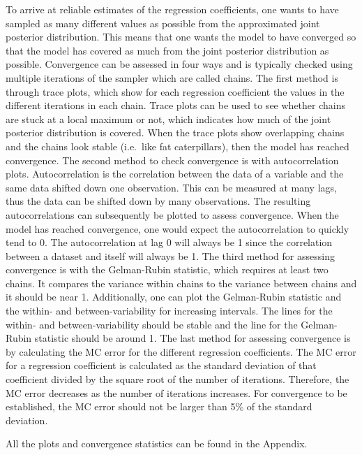 \documentclass[
]{article}
\begin{document}
To arrive at reliable estimates of the regression coefficients, one
wants to have sampled as many different values as possible from the
approximated joint posterior distribution. This means that one wants the
model to have converged so that the model has covered as much from the
joint posterior distribution as possible. Convergence can be assessed in
four ways and is typically checked using multiple iterations of the
sampler which are called chains. The first method is through trace
plots, which show for each regression coefficient the values in the
different iterations in each chain. Trace plots can be used to see
whether chains are stuck at a local maximum or not, which indicates how
much of the joint posterior distribution is covered. When the trace
plots show overlapping chains and the chains look stable (i.e.~like fat
caterpillars), then the model has reached convergence. The second method
to check convergence is with autocorrelation plots. Autocorrelation is
the correlation between the data of a variable and the same data shifted
down one observation. This can be measured at many lags, thus the data
can be shifted down by many observations. The resulting autocorrelations
can subsequently be plotted to assess convergence. When the model has
reached convergence, one would expect the autocorrelation to quickly
tend to 0. The autocorrelation at lag 0 will always be 1 since the
correlation between a dataset and itself will always be 1. The third
method for assessing convergence is with the Gelman-Rubin statistic,
which requires at least two chains. It compares the variance within
chains to the variance between chains and it should be near 1.
Additionally, one can plot the Gelman-Rubin statistic and the within-
and between-variability for increasing intervals. The lines for the
within- and between-variability should be stable and the line for the
Gelman-Rubin statistic should be around 1. The last method for assessing
convergence is by calculating the MC error for the different regression
coefficients. The MC error for a regression coefficient is calculated as
the standard deviation of that coefficient divided by the square root of
the number of iterations. Therefore, the MC error decreases as the
number of iterations increases. For convergence to be established, the
MC error should not be larger than 5\% of the standard deviation.

All the plots and convergence statistics can be found in the Appendix.
\end{document}
